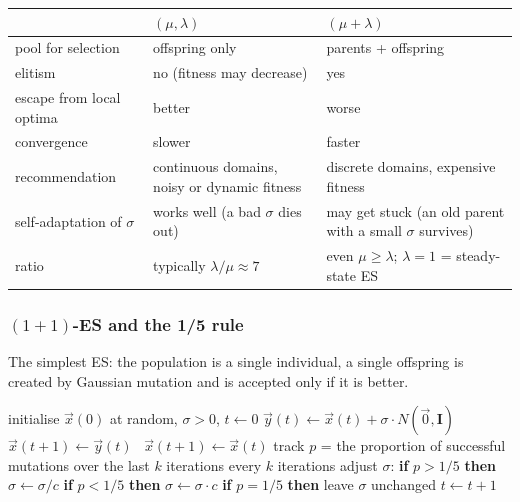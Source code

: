 \documentclass[11pt,a4paper]{article}
\theoremstyle{definition}
\begin{document}
\begin{center}
\begin{tabular}{@{}p{4cm}p{5.5cm}p{5.5cm}@{}}
\toprule
 & $(\mu,\lambda)$ & $(\mu+\lambda)$ \\
\midrule
pool for selection & offspring only & parents + offspring \\
elitism & no (fitness may decrease) & yes \\
escape from local optima & better & worse \\
convergence & slower & faster \\
recommendation & continuous domains, noisy or dynamic fitness & discrete
  domains, expensive fitness \\
self-adaptation of $\sigma$ & works well (a bad $\sigma$ dies out) & may get
  stuck (an old parent with a small $\sigma$ survives) \\
ratio & typically $\lambda/\mu \approx 7$ & even $\mu \ge \lambda$;
  $\lambda = 1$ = steady-state ES \\
\bottomrule
\end{tabular}
\end{center}

\subsubsection{$(1+1)$-ES and the 1/5 rule}

The simplest ES: the population is a single individual, a single offspring is
created by Gaussian mutation and is accepted only if it is better.

\begin{algorithm}[!ht]
\caption{$(1+1)$-ES with the 1/5 rule (minimisation of $f:\mathbb{R}^n \to \mathbb{R}$)}
\begin{algorithmic}[1]
\State initialise $\vec x(0)$ at random, $\sigma > 0$, $t \gets 0$
\Repeat
  \State $\vec y(t) \gets \vec x(t) + \sigma \cdot N(\vec 0, \mathbf{I})$
   $\vec x(t+1) \gets \vec y(t)$
  \Else\ $\vec x(t+1) \gets \vec x(t)$
  \EndIf
  \State track $p$ = the proportion of successful mutations over the last $k$ iterations
  \State every $k$ iterations adjust $\sigma$:
  \State \quad \textbf{if} $p > 1/5$ \textbf{then} $\sigma \gets \sigma / c$
  \State \quad \textbf{if} $p < 1/5$ \textbf{then} $\sigma \gets \sigma \cdot c$
  \State \quad \textbf{if} $p = 1/5$ \textbf{then} leave $\sigma$ unchanged
  \State $t \gets t+1$
\end{algorithmic}
\end{algorithm}
\end{document}
